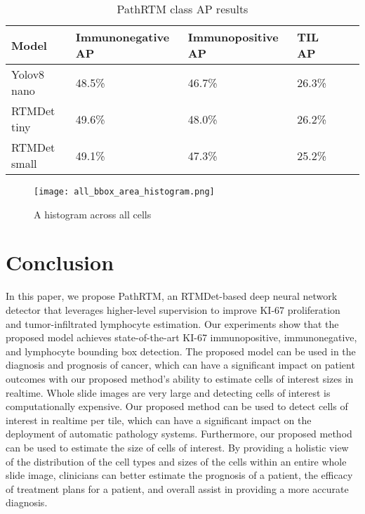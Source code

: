 \documentclass[runningheads]{llncs}
\begin{document}
\begin{table}
	\centering
	\caption{PathRTM class AP results}\label{tab2}
	\begin{tabular}{|l|l|l|l|l|l|}
		\hline
		{\bfseries Model} & {\bfseries Immunonegative AP} & {\bfseries Immunopositive AP} & {\bfseries TIL AP} \\
        \hline
		Yolov8 nano       & 48.5\%                        & 46.7\%                        & 26.3\%             \\
        \hline
		RTMDet tiny       & 49.6\%                        & 48.0\%                        & 26.2\%             \\
		\hline
		RTMDet small       & 49.1\%                        & 47.3\%                        & 25.2\%             \\
        \hline
	\end{tabular}
\end{table}




\begin{figure}
	\centering
	\texttt{[image: all\_bbox\_area\_histogram.png]}
	\caption{A histogram across all cells } \label{allhist}
\end{figure}

\FloatBarrier

\section{Conclusion}

In this paper, we propose PathRTM, an RTMDet-based deep neural network detector that leverages higher-level supervision to improve KI-67 proliferation and tumor-infiltrated lymphocyte estimation. Our experiments show that the proposed model achieves state-of-the-art KI-67 immunopositive, immunonegative, and lymphocyte bounding box detection. The proposed model can be used in the diagnosis and prognosis of cancer, which can have a significant impact on patient outcomes with our proposed method’s ability to estimate cells of interest sizes in realtime. Whole slide images are very large and detecting cells of interest is computationally expensive. Our proposed method can be used to detect cells of interest in realtime per tile, which can have a significant impact on the deployment of automatic pathology systems. Furthermore, our proposed method can be used to estimate the size of cells of interest. By providing a holistic view of the distribution of the cell types and sizes of the cells within an entire whole slide image, clinicians can better estimate the prognosis of a patient, the efficacy of treatment plans for a patient, and overall assist in providing a more accurate diagnosis. 
\end{document}
